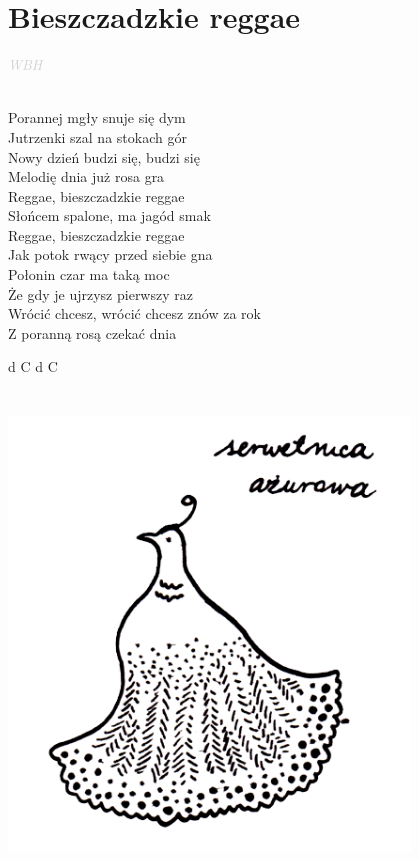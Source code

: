 \documentclass[a5paper, 10pt]{book}
\begin{document}
\section{Bieszczadzkie reggae}\textcolor{lightgray}{\textit{WBH}}\\~\\
\begin{minipage}[t]{0.6\textwidth}
  Porannej mgły snuje się dym\\
  Jutrzenki szal na stokach gór\\
  Nowy dzień budzi się, budzi się\\
  Melodię dnia już rosa gra\\

  \hspace*{5mm}Reggae, bieszczadzkie reggae\\
  \hspace*{5mm}Słońcem spalone, ma jagód smak\\
  \hspace*{5mm}Reggae, bieszczadzkie reggae\\
  \hspace*{5mm}Jak potok rwący przed siebie gna\\

  Połonin czar ma taką moc\\
  Że gdy je ujrzysz pierwszy raz\\
  Wrócić chcesz, wrócić chcesz znów za rok\\
  Z poranną rosą czekać dnia\\
\end{minipage}
\begin{minipage}[t]{0.4\textwidth}
  d C d C\\
  \\
  \\
  \includegraphics[width=0.8\textwidth]{images/bieszczadzkie_reggae.png}\\
\end{minipage}
\end{document}
